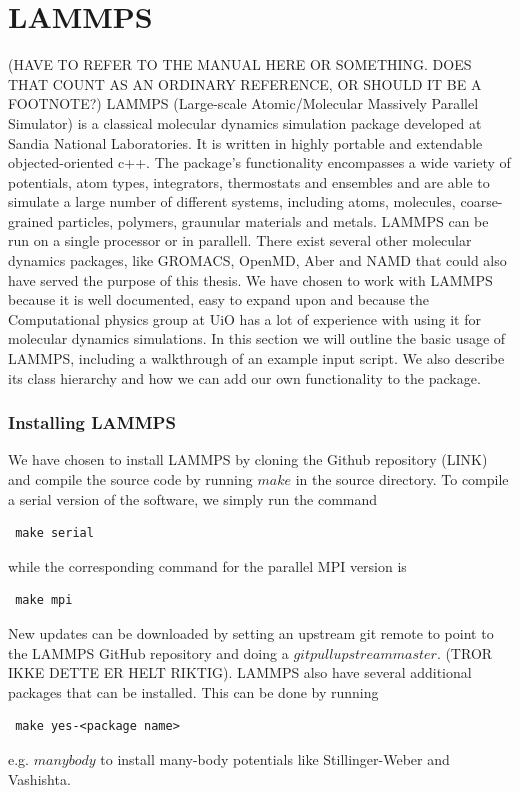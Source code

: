 \documentclass[twoside,english]{uiofysmaster}
\begin{document}
\chapter{LAMMPS}
(HAVE TO REFER TO THE MANUAL HERE OR SOMETHING.
DOES THAT COUNT AS AN ORDINARY REFERENCE, 
OR SHOULD IT BE A FOOTNOTE?)
LAMMPS (Large-scale Atomic/Molecular Massively Parallel Simulator)
is a classical molecular dynamics simulation package 
developed at Sandia National Laboratories. It is written
in highly portable and extendable objected-oriented c++. 
The package's functionality encompasses a wide variety of 
potentials, atom types, integrators, thermostats and 
ensembles and are able to simulate a large number
of different systems, including atoms, molecules, 
coarse-grained particles, polymers, graunular materials
and metals. LAMMPS can be run on a single processor
or in parallell. 
There exist several other molecular dynamics packages, 
like GROMACS, OpenMD, Aber and NAMD that could also
have served the purpose of this thesis. We have chosen
to work with LAMMPS because it is well documented, 
easy to expand upon and because the Computational
physics group at UiO has a lot of experience with using
it for molecular dynamics simulations. 
In this section we will outline the basic usage of LAMMPS, including
a walkthrough of an example input script. We also describe its
class hierarchy and how we can add our own functionality
to the package.

\subsection{Installing LAMMPS}
We have chosen to install LAMMPS by cloning
the Github repository (LINK) and compile the source
code by running $make$ in the source directory. 
To compile a serial version of the software, we simply run
the command
\begin{lstlisting}
 make serial
\end{lstlisting}
while the corresponding command for the parallel
MPI version is
\begin{lstlisting}
 make mpi
\end{lstlisting}
New updates can be downloaded by setting an
upstream git remote to point to the LAMMPS
GitHub repository and doing a $git pull upstream master$.
(TROR IKKE DETTE ER HELT RIKTIG). 
LAMMPS also have several additional packages that
can be installed. This can be done by running
\begin{lstlisting}
 make yes-<package name>
\end{lstlisting}
e.g. $manybody$ to install many-body potentials
like Stillinger-Weber and Vashishta. 
\end{document}
